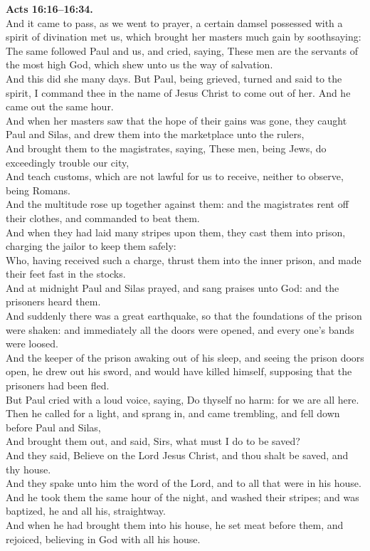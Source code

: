 \documentclass[10pt]{article} %
\begin{document}
{\begin{minipage}[t]{0.49\textwidth}
\textbf{Acts 16:16--16:34.}\\
And it came to pass, as we went to prayer, a certain damsel possessed with a spirit of divination met us, which brought her masters much gain by soothsaying:\\
The same followed Paul and us, and cried, saying, These men are the servants of the most high God, which shew unto us the way of salvation.\\
And this did she many days. But Paul, being grieved, turned and said to the spirit, I command thee in the name of Jesus Christ to come out of her. And he came out the same hour.\\
And when her masters saw that the hope of their gains was gone, they caught Paul and Silas, and drew them into the marketplace unto the rulers,\\
And brought them to the magistrates, saying, These men, being Jews, do exceedingly trouble our city,\\
And teach customs, which are not lawful for us to receive, neither to observe, being Romans.\\
And the multitude rose up together against them: and the magistrates rent off their clothes, and commanded to beat them.\\
And when they had laid many stripes upon them, they cast them into prison, charging the jailor to keep them safely:\\
Who, having received such a charge, thrust them into the inner prison, and made their feet fast in the stocks.\\
And at midnight Paul and Silas prayed, and sang praises unto God: and the prisoners heard them.\\
And suddenly there was a great earthquake, so that the foundations of the prison were shaken: and immediately all the doors were opened, and every one's bands were loosed.\\
And the keeper of the prison awaking out of his sleep, and seeing the prison doors open, he drew out his sword, and would have killed himself, supposing that the prisoners had been fled.\\
But Paul cried with a loud voice, saying, Do thyself no harm: for we are all here.\\
Then he called for a light, and sprang in, and came trembling, and fell down before Paul and Silas,\\
And brought them out, and said, Sirs, what must I do to be saved?\\
And they said, Believe on the Lord Jesus Christ, and thou shalt be saved, and thy house.\\
And they spake unto him the word of the Lord, and to all that were in his house.\\
And he took them the same hour of the night, and washed their stripes; and was baptized, he and all his, straightway.\\
And when he had brought them into his house, he set meat before them, and rejoiced, believing in God with all his house.\\

\end{minipage}}
\end{document}
